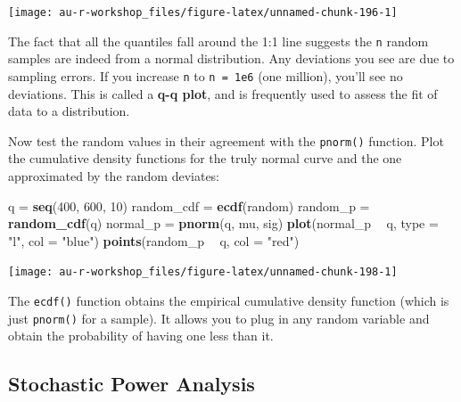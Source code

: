 \documentclass[]{book}
\newenvironment{Shaded}{\begin{snugshade}}{\end{snugshade}}
\newcommand{\DataTypeTok}[1]{\textcolor[rgb]{0.13,0.29,0.53}{#1}}
\newcommand{\DecValTok}[1]{\textcolor[rgb]{0.00,0.00,0.81}{#1}}
\newcommand{\KeywordTok}[1]{\textcolor[rgb]{0.13,0.29,0.53}{\textbf{#1}}}
\newcommand{\NormalTok}[1]{#1}
\newcommand{\OperatorTok}[1]{\textcolor[rgb]{0.81,0.36,0.00}{\textbf{#1}}}
\newcommand{\StringTok}[1]{\textcolor[rgb]{0.31,0.60,0.02}{#1}}
\begin{document}
\begin{center}\texttt{[image: au-r-workshop\_files/figure-latex/unnamed-chunk-196-1]} \end{center}

The fact that all the quantiles fall around the 1:1 line suggests the \texttt{n} random samples are indeed from a normal distribution. Any deviations you see are due to sampling errors. If you increase \texttt{n} to \texttt{n\ =\ 1e6} (one million), you'll see no deviations. This is called a \textbf{q-q plot}, and is frequently used to assess the fit of data to a distribution.

Now test the random values in their agreement with the \texttt{pnorm()} function. Plot the cumulative density functions for the truly normal curve and the one approximated by the random deviates:

\begin{Shaded}
\begin{Highlighting}[]
\NormalTok{q =}\StringTok{ }\KeywordTok{seq}\NormalTok{(}\DecValTok{400}\NormalTok{, }\DecValTok{600}\NormalTok{, }\DecValTok{10}\NormalTok{)}
\NormalTok{random_cdf =}\StringTok{ }\KeywordTok{ecdf}\NormalTok{(random)}
\NormalTok{random_p =}\StringTok{ }\KeywordTok{random_cdf}\NormalTok{(q)}
\NormalTok{normal_p =}\StringTok{ }\KeywordTok{pnorm}\NormalTok{(q, mu, sig)}
\KeywordTok{plot}\NormalTok{(normal_p }\OperatorTok{~}\StringTok{ }\NormalTok{q, }\DataTypeTok{type =} \StringTok{"l"}\NormalTok{, }\DataTypeTok{col =} \StringTok{"blue"}\NormalTok{)}
\KeywordTok{points}\NormalTok{(random_p }\OperatorTok{~}\StringTok{ }\NormalTok{q, }\DataTypeTok{col =} \StringTok{"red"}\NormalTok{)}
\end{Highlighting}
\end{Shaded}

\begin{center}\texttt{[image: au-r-workshop\_files/figure-latex/unnamed-chunk-198-1]} \end{center}

The \texttt{ecdf()} function obtains the empirical cumulative density function (which is just \texttt{pnorm()} for a sample). It allows you to plug in any random variable and obtain the probability of having one less than it.

\hypertarget{power-ex}{%
\subsection{Stochastic Power Analysis}\label{power-ex}}
\end{document}
